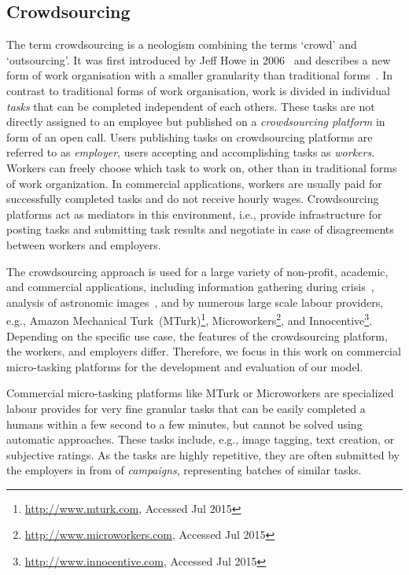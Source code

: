 \subsection{Crowdsourcing}
The term crowdsourcing is a neologism combining the terms `crowd' and `outsourcing'.
It was first introduced by Jeff Howe in 2006~\cite{Howe2006} and describes a new form of work organisation with a smaller granularity than traditional forms~\cite{Hossfeld2011c}.
In contrast to traditional forms of work organisation, work is divided in individual \emph{tasks} that can be completed independent of each others. 
These tasks are not directly assigned to an employee but published on a \emph{crowdsourcing platform} in form of an open call.
Users publishing tasks on crowdsourcing platforms are referred to as \emph{employer}, users accepting and accomplishing tasks as \emph{workers}.
Workers can freely choose which task to work on, other than in traditional forms of work organization.
In commercial applications, workers are usually paid for successfully completed tasks and do not receive hourly wages.
Crowdsourcing platforms act as mediators in this environment, i.e., provide infrastructure for posting tasks and submitting task results and negotiate in case of disagreements between workers and employers.

The crowdsourcing approach is used for a large variety of non-profit, academic, and commercial applications, including information gathering during crisis~\cite{Morrow2011}, analysis of astronomic images~\cite{Raddick2010}, and by numerous large scale labour providers, e.g., Amazon Mechanical Turk~(MTurk)\footnote{\url{http://www.mturk.com}, Accessed Jul 2015}, Microworkers\footnote{\url{http://www.microworkers.com}, Accessed Jul 2015}, and Innocentive\footnote{\url{http://www.innocentive.com}, Accessed Jul 2015}.
Depending on the specific use case, the features of the crowdsourcing platform, the workers, and employers differ.
Therefore, we focus in this work on commercial micro-tasking platforms for the development and evaluation of our model.

Commercial micro-tasking platforms like MTurk or Microworkers are specialized labour provides for very fine granular tasks that can be easily completed a humans within a few second to a few minutes, but cannot be solved using automatic approaches. 
These tasks include, e.g., image tagging, text creation, or subjective ratings.
As the tasks are highly repetitive, they are often submitted by the employers in from of \emph{campaigns}, representing batches of similar tasks.

